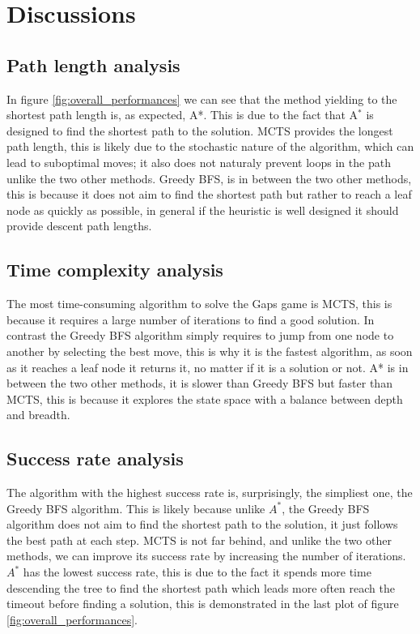 \chapter{Discussions}
\section{Path length analysis}
In figure \ref{fig:overall_performances} we can see that the method yielding to the shortest path length is, as expected, A*. This is due to the fact that A$^*$ is designed to find the shortest path to the solution. MCTS provides the longest path length, this is likely due to the stochastic nature of the algorithm, which can lead to suboptimal moves; it also does not naturaly prevent loops in the path unlike the two other methods. Greedy BFS, is in between the two other methods, this is because it does not aim to find the shortest path but rather to reach a leaf node as quickly as possible, in general if the heuristic is well designed it should provide descent path lengths.

\section{Time complexity analysis}
The most time-consuming algorithm to solve the Gaps game is MCTS, this is because it requires a large number of iterations to find a good solution. In contrast the Greedy BFS algorithm simply requires to jump from one node to another by selecting the best move, this is why it is the fastest algorithm, as soon as it reaches a leaf node it returns it, no matter if it is a solution or not. A* is in between the two other methods, it is slower than Greedy BFS but faster than MCTS, this is because it explores the state space with a balance between depth and breadth.

\section{Success rate analysis}
The algorithm with the highest success rate is, surprisingly, the simpliest one, the Greedy BFS algorithm. This is likely because unlike $A^*$, the Greedy BFS algorithm does not aim to find the shortest path to the solution, it just follows the best path at each step. MCTS is not far behind, and unlike the two other methods, we can improve its success rate by increasing the number of iterations. $A^*$ has the lowest success rate, this is due to the fact it spends more time descending the tree to find the shortest path which leads more often reach the timeout before finding a solution, this is demonstrated in the last plot of figure \ref{fig:overall_performances}.

